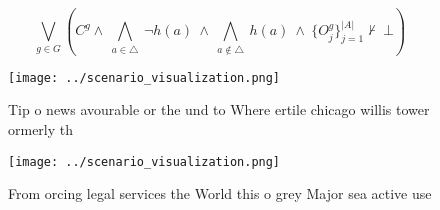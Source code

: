 \documentclass[a4paper]{article}
\begin{document}
\[\bigvee_{g\in G} (C^g \wedge\ \bigwedge_{a\in \triangle}\ \neg h(a)\ \wedge\ \bigwedge_{a\notin \triangle}\ h(a)\ \wedge\ \{O_j^g\}_{j=1}^{|A|} \nvdash\ \bot )\]

\begin{figure}
\centering
\texttt{[image: ../scenario\_visualization.png]}
\caption{Tip o news avourable or the und to Where ertile chicago willis tower ormerly th
}
\end{figure}
 
\begin{figure}
\centering
\texttt{[image: ../scenario\_visualization.png]}
\caption{From orcing legal services the World this o grey Major sea active use
}
\end{figure}
 
\end{document}
